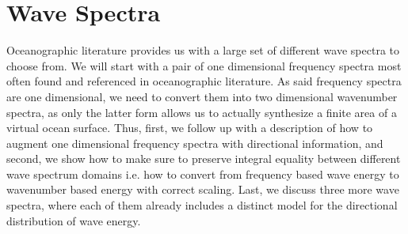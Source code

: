 \section{Wave Spectra}
\label{sec:wave_spectra}
Oceanographic literature provides us with a large set of different wave spectra
to choose from.
We will start with a pair of one dimensional frequency spectra most often found
and referenced in oceanographic literature. As said frequency spectra are
one dimensional, we need to convert them into two dimensional wavenumber
spectra, as only the latter form allows us to actually synthesize a finite area
of a virtual ocean surface. Thus, first, we follow up with a description of how
to augment one dimensional frequency spectra with directional information, and
second, we show how to make sure to preserve integral equality between
different wave spectrum domains i.e. how to convert from frequency based wave
energy to wavenumber based energy with correct scaling.
Last, we discuss three more wave spectra, where each of them already includes a
distinct model for the directional distribution of wave energy.
% 
% 
%
